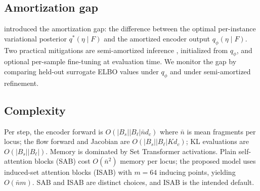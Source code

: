 \subsection{Amortization gap}
\label{ssec:amortization}
\citet{cremer2018amortization} introduced the amortization gap: the difference between the optimal per-instance variational posterior $q^*(\eta\mid F)$ and the amortized encoder output $q_\phi(\eta\mid F)$. Two practical mitigations are semi-amortized inference \citep{kim2018semiamortized}, initialized from $q_\phi$, and optional per-sample fine-tuning at evaluation time. We monitor the gap by comparing held-out surrogate ELBO values under $q_\phi$ and under semi-amortized refinement.

\subsection{Complexity}
Per step, the encoder forward is $O(|B_s||B_\ell|\bar n d_c)$ where $\bar n$ is mean fragments per locus; the flow forward and Jacobian are $O(|B_s||B_\ell|K d_c)$; KL evaluations are $O(|B_s||B_\ell|)$. Memory is dominated by Set Transformer activations. Plain self-attention blocks (SAB) cost $O(\bar n^2)$ memory per locus; the proposed model uses induced-set attention blocks (ISAB) with $m=64$ inducing points, yielding $O(\bar n m)$. SAB and ISAB are distinct choices, and ISAB is the intended default.

